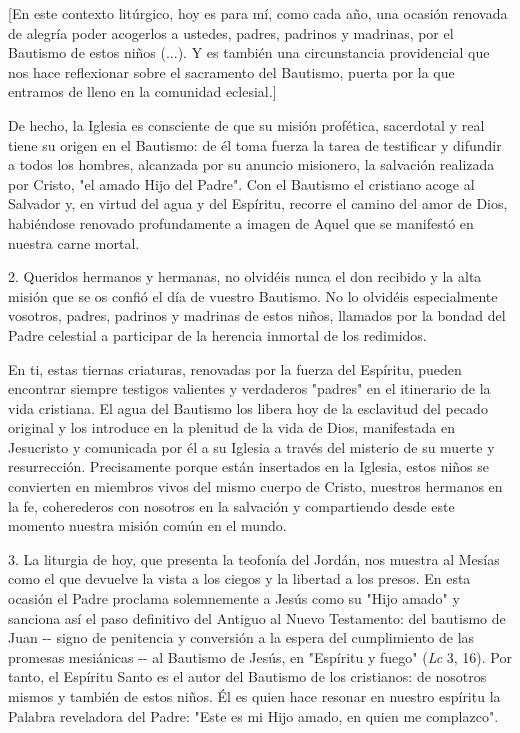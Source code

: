 {[}En este contexto litúrgico, hoy es para mí, como cada año, una
ocasión renovada de alegría poder acogerlos a ustedes, padres, padrinos
y madrinas, por el Bautismo de estos niños (...). Y es también una
circunstancia providencial que nos hace reflexionar sobre el sacramento
del Bautismo, puerta por la que entramos de lleno en la comunidad
eclesial.{]}

De hecho, la Iglesia es consciente de que su misión profética,
sacerdotal y real tiene su origen en el Bautismo: de él toma fuerza la
tarea de testificar y difundir a todos los hombres, alcanzada por su
anuncio misionero, la salvación realizada por Cristo, "el amado Hijo del
Padre". Con el Bautismo el cristiano acoge al Salvador y, en virtud del
agua y del Espíritu, recorre el camino del amor de Dios, habiéndose
renovado profundamente a imagen de Aquel que se manifestó en nuestra
carne mortal.

2. Queridos hermanos y hermanas, no olvidéis nunca el don recibido y la
alta misión que se os confió el día de vuestro Bautismo. No lo olvidéis
especialmente vosotros, padres, padrinos y madrinas de estos niños,
llamados por la bondad del Padre celestial a participar de la herencia
inmortal de los redimidos.

En ti, estas tiernas criaturas, renovadas por la fuerza del Espíritu,
pueden encontrar siempre testigos valientes y verdaderos "padres" en el
itinerario de la vida cristiana. El agua del Bautismo los libera hoy de
la esclavitud del pecado original y los introduce en la plenitud de la
vida de Dios, manifestada en Jesucristo y comunicada por él a su Iglesia
a través del misterio de su muerte y resurrección. Precisamente porque
están insertados en la Iglesia, estos niños se convierten en miembros
vivos del mismo cuerpo de Cristo, nuestros hermanos en la fe,
coherederos con nosotros en la salvación y compartiendo desde este
momento nuestra misión común en el mundo.

3. La liturgia de hoy, que presenta la teofonía del Jordán, nos muestra
al Mesías como el que devuelve la vista a los ciegos y la libertad a los
presos. En esta ocasión el Padre proclama solemnemente a Jesús como su
"Hijo amado" y sanciona así el paso definitivo del Antiguo al Nuevo
Testamento: del bautismo de Juan -\/- signo de penitencia y conversión a
la espera del cumplimiento de las promesas mesiánicas -\/- al Bautismo
de Jesús, en "Espíritu y fuego" (\emph{Lc} 3, 16). Por tanto, el
Espíritu Santo es el autor del Bautismo de los cristianos: de nosotros
mismos y también de estos niños. Él es quien hace resonar en nuestro
espíritu la Palabra reveladora del Padre: "Este es mi Hijo amado, en
quien me complazco".

